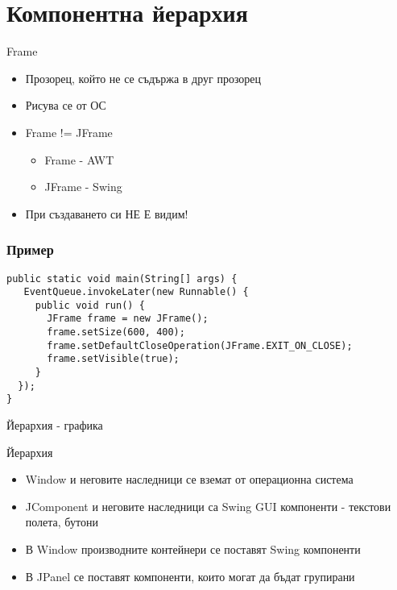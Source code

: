 \documentclass{beamer}
\begin{document}
\section{Компонентна йерархия}

\begin{frame}{Frame}
  \transdissolve
  \begin{itemize}
  \item Прозорец, който не се съдържа в друг прозорец
  \item Рисува се от ОС
  \item Frame != JFrame
    \begin{itemize}
      \item Frame - AWT
      \item JFrame - Swing
    \end{itemize}
    \item При създаването си НЕ Е видим!
  \end{itemize}
\end{frame}

\begin{frame}[fragile]
  \frametitle{Пример}
  \transdissolve
\begin{lstlisting}
public static void main(String[] args) {
   EventQueue.invokeLater(new Runnable() {
     public void run() {  
       JFrame frame = new JFrame();
       frame.setSize(600, 400);
       frame.setDefaultCloseOperation(JFrame.EXIT_ON_CLOSE);
       frame.setVisible(true);
     }
  });
}
\end{lstlisting}
\end{frame}


\begin{frame}{Йерархия - графика}
  \transdissolve
  
\end{frame}

\begin{frame}{Йерархия}
  \transdissolve
  \begin{itemize}
  \item Window и неговите наследници се вземат от операционна система
  \item JComponent и неговите наследници са Swing GUI компоненти -
    текстови полета, бутони
  \item В Window производните контейнери се поставят Swing компоненти
  \item В JPanel се поставят компоненти, които могат да бъдат групирани
  \end{itemize}
\end{frame}
\end{document}
